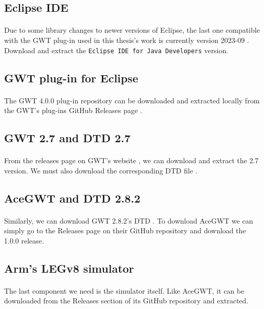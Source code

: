 \subsection{Eclipse IDE}
\paragraph{}
Due to some library changes to newer versions of Eclipse, the last one compatible with the GWT plug-in used in this thesis's work is currently version 2023-09 \cite{web:eclipse202309}. Download and extract the \verb|Eclipse IDE for Java Developers| version.
\subsection{GWT plug-in for Eclipse}
\paragraph{}
The GWT 4.0.0 plug-in repository can be downloaded and extracted locally from the GWT's plug-ins GitHub Releases page \cite{web:gwtplugin4.0}.
\subsection{GWT 2.7 and DTD 2.7}
\paragraph{}
From the releases page on GWT's website \cite{web:gwtreleases}, we can download and extract the 2.7 version. We must also download the corresponding DTD file \cite{web:gwtdtd2.7}.
\subsection{AceGWT and DTD 2.8.2}
\paragraph{}
Similarly, we can download GWT 2.8.2's DTD \cite{web:gwtdtd2.8.2}. To download AceGWT we can simply go to the Releases page on their GitHub repository \cite{web:acegwtgit} and download the 1.0.0 release.
\subsection{Arm's LEGv8 simulator}
\paragraph{}
The last component we need is the simulator itself. Like AceGWT, it can be downloaded from the Releases section of its GitHub repository \cite{legv8simARMrepogit} and extracted.

